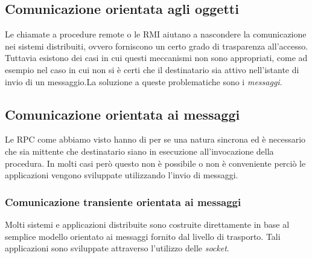 \subsection{Comunicazione orientata agli oggetti}
Le chiamate a procedure remote o le RMI aiutano a nascondere la comunicazione nei sistemi distribuiti, ovvero forniscono un certo grado di trasparenza all'accesso. Tuttavia esistono dei casi in cui questi meccanismi non sono appropriati, come ad esempio nel caso in cui non si è certi che il destinatario  sia attivo nell'istante di invio di un messaggio.La soluzione a queste problematiche sono i \emph{messaggi}.
\subsection{Comunicazione orientata ai messaggi}
Le RPC come abbiamo visto hanno di per se una natura sincrona ed è necessario che sia mittente che destinatario siano in esecuzione all'invocazione della procedura. In molti casi però questo non è possibile o non è conveniente perciò le applicazioni vengono sviluppate utilizzando l'invio di messaggi.
\subsubsection{Comunicazione transiente orientata ai messaggi}
Molti sistemi e applicazioni distribuite sono costruite direttamente in base al semplice modello orientato ai messaggi fornito dal livello di trasporto. Tali applicazioni sono sviluppate attraverso l'utilizzo delle \emph{socket}.
